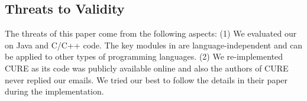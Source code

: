 \subsection{Threats to Validity}
The threats of this paper come from the following aspects: 
(1) We evaluated our {\tool} on Java and C/C++ code. 
The key modules in {\tool} are language-independent and can be applied to
other types of programming languages. 
(2) We re-implemented CURE as its code was publicly available online and also the authors of CURE never replied our emails. We tried our best to follow the details in their paper during the implementation. 


